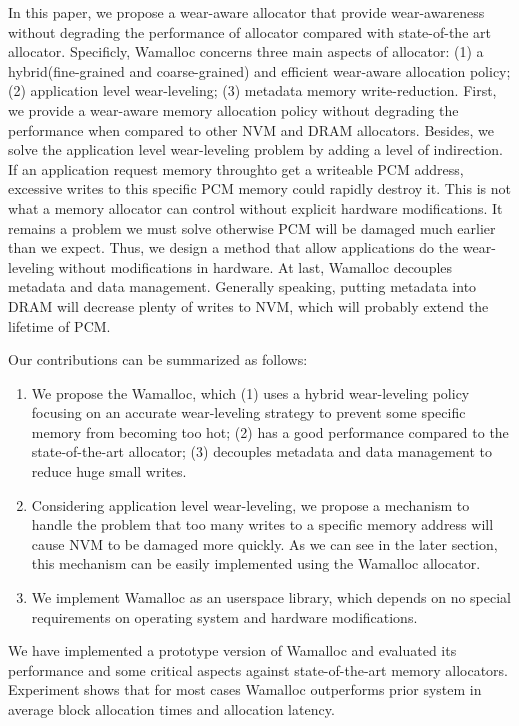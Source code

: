 \documentclass{vldb}
\begin{document}
In this paper, we propose a wear-aware allocator that provide wear-awareness without degrading the performance of allocator compared with state-of-the art allocator. 
Specificly, Wamalloc concerns three main aspects of allocator:
(1) a hybrid(fine-grained and coarse-grained) and efficient wear-aware allocation policy;
(2) application level wear-leveling;
(3) metadata memory write-reduction.
First, we provide a wear-aware memory allocation policy without degrading the performance when compared to other NVM and DRAM allocators.
Besides, we solve the application level wear-leveling problem by adding a level of indirection.
If an application request memory throughto get a writeable PCM address, excessive writes to this specific PCM memory could rapidly destroy it. 
This is not what a memory allocator can control without explicit hardware modifications.
It remains a problem we must solve otherwise PCM will be damaged much earlier than we expect.
Thus, we design a method that allow applications do the wear-leveling without modifications in hardware.
At last, Wamalloc decouples metadata and data management.
Generally speaking, putting metadata into DRAM will decrease plenty of writes to NVM, which will probably extend the lifetime of PCM.

Our contributions can be summarized as follows:
\begin{enumerate}
    \item We propose the Wamalloc, which
        (1) uses a hybrid wear-leveling policy focusing on an accurate wear-leveling strategy to prevent some specific memory from becoming too hot;
        (2) has a good performance compared to the state-of-the-art allocator;
        (3) decouples metadata and data management to reduce huge small writes.
    \item Considering application level wear-leveling, 
        we propose a mechanism to handle the problem that too many writes to a specific memory address will cause NVM to be damaged more quickly.
        As we can see in the later section, this mechanism can be easily implemented using the Wamalloc allocator.
    \item We implement Wamalloc as an userspace library, which depends on no special requirements on operating system and hardware modifications.
\end{enumerate}

We have implemented a prototype version of Wamalloc and evaluated its performance and some critical aspects against state-of-the-art memory allocators. 
Experiment shows that for most cases Wamalloc outperforms prior system in average block allocation times and allocation latency.
\end{document}
